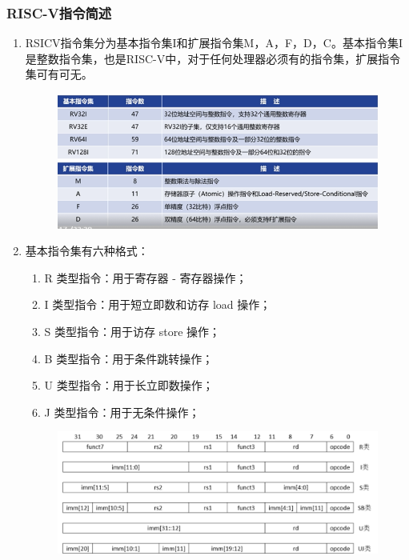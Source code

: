\documentclass[a4paper, 14pt, oneside]{book} %
\numberwithin{equation}{subsection}
\begin{document}
			\subsubsection{RISC-V指令简述}
				\begin{enumerate}
					\item 
						RSICV指令集分为基本指令集I和扩展指令集M，A，F，D，C。基本指令集I是整数指令集，也是RISC-V中，对于任何处理器必须有的指令集，扩展指令集可有可无。
						\begin{figure}[!htbp]
							\centering
							\includegraphics[scale=0.6]{img/two.png}
						\end{figure}
					\item
						基本指令集有六种格式：
					\begin{enumerate}		
						\item 
							R 类型指令：用于寄存器 - 寄存器操作；
						\item 
							I 类型指令：用于短立即数和访存 load 操作；
						\item 
							S 类型指令：用于访存 store 操作；
						\item 
							B 类型指令：用于条件跳转操作；
						\item 
							U 类型指令：用于长立即数操作；
						\item 
							J 类型指令：用于无条件操作；
					\end{enumerate}
					\begin{figure}[!htbp]
						\centering
						\includegraphics[scale=0.5]{img/three.png}
					\end{figure}
				\end{enumerate}
\end{document}
